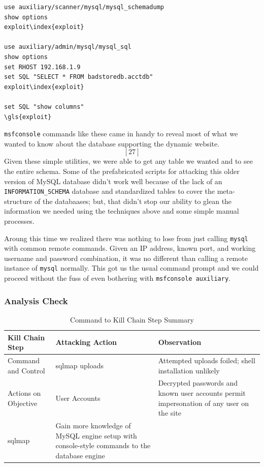 \begin{lstlisting}
use auxiliary/scanner/mysql/mysql_schemadump
show options
exploit\index{exploit}

use auxiliary/admin/mysql/mysql_sql
show options
set RHOST 192.168.1.9
set SQL "SELECT * FROM badstoredb.acctdb"
exploit\index{exploit}

set SQL "show columns"
\gls{exploit}
\end{lstlisting}
\texttt{msfconsole} commands like these came in handy to reveal most of what we wanted to know about the database supporting the dynamic website. \[[27]\]  Given these simple utilities, we were able to get any table we wanted and to see the entire schema.  Some of the prefabricated scripts for attacking this older version of MySQL database didn't work well because of the lack of an \texttt{INFORMATION\_SCHEMA} database and standardized tables to cover the meta-structure of the databaases; but, that didn't stop our ability to glean the information we needed using the techniques above and some simple manual processes.  

Aroung this time we realized there was nothing to lose from just calling \texttt{mysql} with common remote commands.  Given an IP address, known port, and working username and password combination, it was no different than calling a remote instance of \texttt{mysql} normally.  This got us the usual command prompt and we could proceed without the fuss of even bothering with \texttt{msfconsole auxiliary}.

\subsubsection{Analysis Check}
\begin{table}[H]
\caption{Command to Kill Chain Step Summary}
\centering
\begin{tabular}{|l|l|l|}
\hline
Kill Chain Step & Attacking Action & Observation \\
\hline
Command and Control & sqlmap uploads & Attempted uploads foiled; shell installation unlikely \\
Actions on Objective & User Accounts & Decrypted passwords and known user accounts permit impersonation of any user on the site \\
sqlmap & Gain more knowledge of MySQL engine setup with console-style commands to the database engine &  \\
\hline
\end{tabular}
\end{table}

